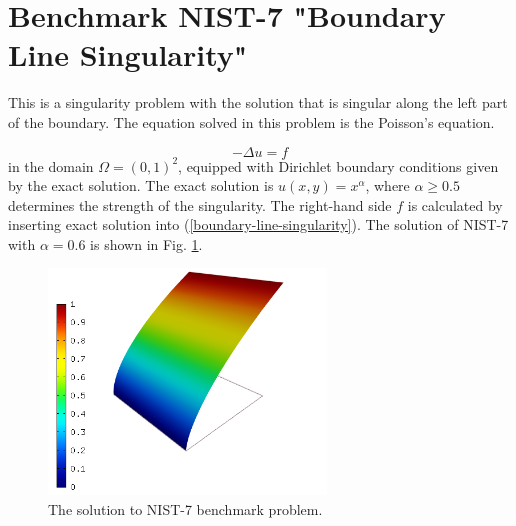 \section{Benchmark NIST-7 "Boundary Line Singularity"}
\label{sec:bench-7}

This is a singularity problem with the solution that is singular along the left part of the boundary.
The equation solved in this problem is the Poisson's equation.

\begin{equation} \label{boundary-line-singularity}
-\Delta u = f
\end{equation}
in the domain $\Omega = (0, 1)^2$, equipped with Dirichlet boundary conditions
given by the exact solution. The exact solution is
$u(x,y) = x^{\alpha}$,
where $\alpha \geq 0.5$ determines the strength of the singularity.
The right-hand side $f$ is calculated by inserting exact solution into (\ref{boundary-line-singularity}).
The solution of NIST-7 with $\alpha = 0.6$ is shown in Fig. \ref{fig:sln-nist07}.

\begin{figure}[!ht]
\centering
\includegraphics[height=6cm]{nist/nist-7/solution.png}
\caption{The solution to NIST-7 benchmark problem.}
\label{fig:sln-nist07}
\end{figure}

